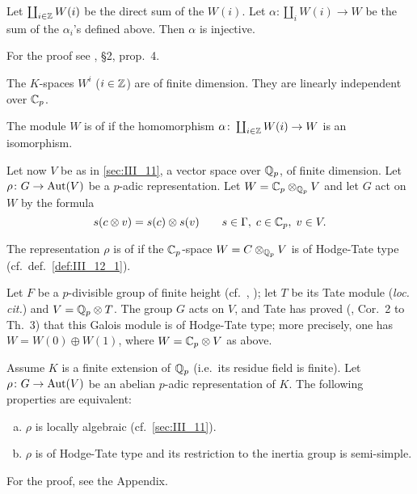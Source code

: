 \begin{prop}[Tate]
	Let $\coprod_{i\in \mathbb{Z}} W(i)$ be the direct sum of the $W(i)$. Let
	$\alpha\colon \coprod_i W(i) \to W$ be the sum of the $\alpha_i$'s
	defined above. Then $\alpha$ is injective.
\end{prop}
For the proof see \cite{27}, \S 2, prop.~4.
\begin{corp}
	The $K$-spaces $W^i$ ($i \in \mathbb{Z}$) are of finite dimension.
	They are linearly independent over $\mathbb{C}_p$.
\end{corp}

\begin{mydef}\label{def:III_12_1}
	The module $W$ is of %
	if the homomorphism $\alpha\colon \coprod_{i\in\mathbb{Z}} W(i) \to W$ is an
	isomorphism.
\end{mydef}

Let now $V$ be as in \ref{sec:III_11}, a vector space over $\mathbb{Q}_p$, of finite
dimension. Let $\rho\colon G \to \operatorname{Aut}(V)$ be a $p$-adic representation. Let $W
= \mathbb{C}_p \otimes_{\mathbb{Q}_p} V$ and let $G$ act on $W$ by the formula
\dpage
\[
	s(c\otimes v) = s(c) \otimes s(v) \qquad
	s\in \Gamma, \; c\in \mathbb{C}_p, \; v\in V.
\]
\begin{mydef}
	The representation $\rho$ is of %
	 if the $\mathbb{C}_p$-space $W = C \otimes_{\mathbb{Q}_p} V$ is of
	Hodge-Tate type (cf.\ def.~\ref{def:III_12_1}).
\end{mydef}

\begin{ex}
	Let $F$ be a $p$-divisible group of finite height (cf.\ \cite{26},
	\cite{39}); let $T$ be its Tate module (\emph{loc. cit.}) and $V = \mathbb{Q}_p
	\otimes T$. The group $G$ acts on $V$, and Tate has proved (\cite{39},
	Cor.~2 to Th.~3) that this Galois module is of Hodge-Tate type; more
	precisely, one has $W = W(0) \oplus W(1)$, where $W = \mathbb{C}_p \otimes V$ as
	above.
\end{ex}
\begin{thm}[Tate]
Assume $K$ is a finite extension of $\mathbb{Q}_p$ (i.e.\ its residue field is finite).
Let $\rho\colon G \to \operatorname{Aut}(V)$ be an abelian $p$-adic representation of $K$.
The following properties are equivalent:
\begin{enumerate}[(a)]
\item $\rho$ is locally algebraic (cf.\ \ref{sec:III_11}).
\item $\rho$ is of Hodge-Tate type and its restriction to the inertia group is
	semi-simple.
\end{enumerate}
\end{thm}
For the proof, see the Appendix.


